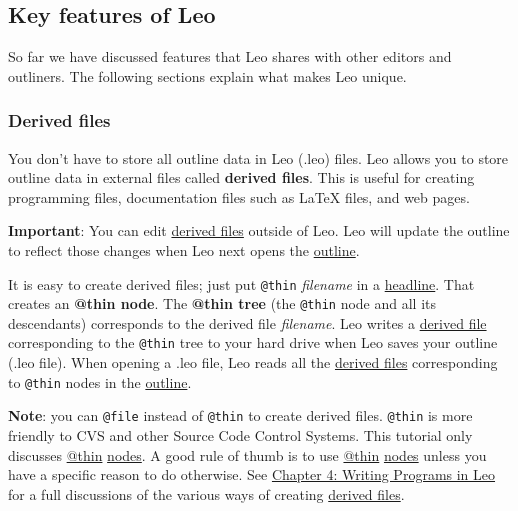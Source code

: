 \documentclass[10pt,a4paper,english]{article}
\begin{document}

\hypertarget{key-features-of-leo}{}
\subsection*{Key features of Leo}

So far we have discussed features that Leo shares with other editors and outliners.
The following sections explain what makes Leo unique.



\hypertarget{derived-files}{}
\subsubsection*{Derived files}

You don't have to store all outline data in Leo (.leo) files.
Leo allows you to store outline data in external files called \textbf{derived files}.
This is useful for creating programming files, documentation files such as LaTeX files, and web pages.

\textbf{Important}:
You can edit \href{\#derived-files}{derived files} outside of Leo.
Leo will update the outline to reflect those changes when Leo next opens the \href{\#leo-s-main-window}{outline}.

It is easy to create derived files; just put \texttt{@thin} \emph{filename} in a \href{glossary.html\#headline}{headline}.
That creates an \textbf{@thin node}.
The \textbf{@thin tree} (the \texttt{@thin} node and all its descendants) corresponds to the derived file \emph{filename}.
Leo writes a \href{\#derived-files}{derived file} corresponding to the \texttt{@thin} tree to your hard drive when Leo saves your outline (.leo file).
When opening a .leo file, Leo reads all the \href{\#derived-files}{derived files} corresponding to \texttt{@thin} nodes in the \href{\#leo-s-main-window}{outline}.

\textbf{Note}: you can \texttt{@file} instead of \texttt{@thin} to create derived files.
\texttt{@thin} is more friendly to CVS and other Source Code Control Systems.
This tutorial only discusses \href{glossary.html\#thin}{@thin} \href{glossary.html\#nodes}{nodes}.
A good rule of thumb is to use \href{glossary.html\#thin}{@thin} \href{glossary.html\#nodes}{nodes} unless you have a specific reason to do otherwise.
See \href{directives.html}{Chapter 4: Writing Programs in Leo} for a full discussions of the various ways of creating \href{\#derived-files}{derived files}.
\end{document}

